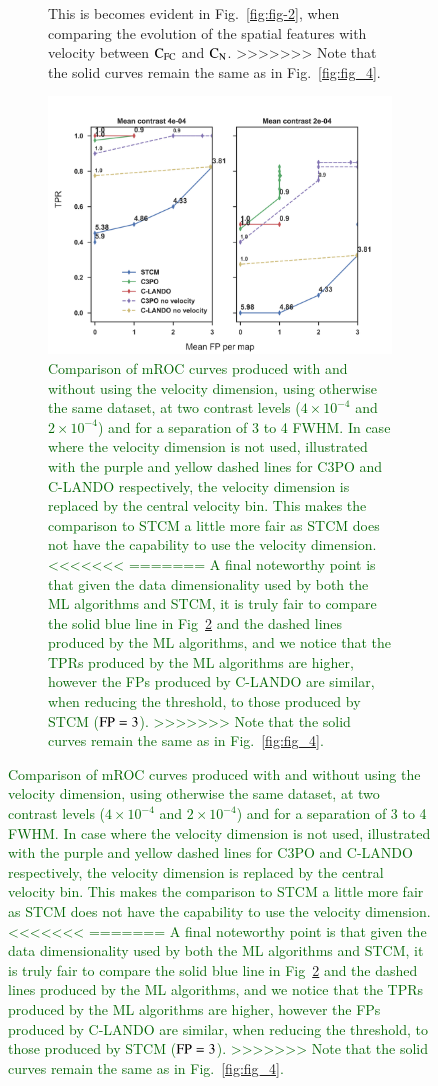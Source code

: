 \documentclass{aa}
\newcommand{\newchange}[1]{\textcolor{darkgreen}{#1}}
\begin{document}
{{{\begin{figure}
{\begin{figure}
{This is becomes evident in Fig.~\ref{fig:fig-2}, when comparing the evolution of the spatial features with velocity between $\rm{C_{FC}}$ and $\rm{C_N}$.
>>>>>>>
    Note that the solid curves remain the same as in Fig.~\ref{fig:fig_4}.
    }
\end{figure}
\begin{figure}
    \centering
    \includegraphics[width=\textwidth]{Fig6_April2024_referee_final.png}
    \caption{\newchange{Comparison of mROC curves produced with and without using the velocity dimension, using otherwise the same dataset, at two contrast levels ($4\times 10^{-4}$ and $2\times 10^{-4}$) and for a separation of 3 to 4 FWHM. In case where the velocity dimension is not used, illustrated with the purple and yellow dashed lines for C3PO and C-LANDO respectively, the velocity dimension is replaced by the central velocity bin. This makes the comparison to STCM a little more fair as STCM does not have the capability to use the velocity dimension.
<<<<<<<
=======
A final noteworthy point is that given the data dimensionality used by both the ML algorithms and STCM, it is truly fair to compare the solid blue line in Fig~\ref{fig:novel_roc} and the dashed lines produced by the ML algorithms, and we notice that the TPRs produced by the ML algorithms are higher, however the FPs produced by C-LANDO are similar, when reducing the threshold, to those produced by STCM (${\rm FP}=3$). 
>>>>>>>
    Note that the solid curves remain the same as in Fig.~\ref{fig:fig_4}.}
    }
    \label{fig:novel_roc}
\end{figure}


}
\end{figure}}}}
\end{document}
